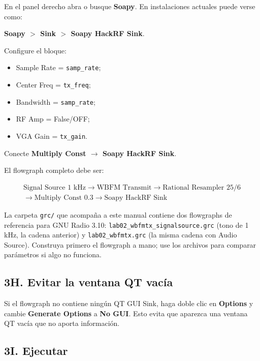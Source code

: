 En el panel derecho abra o busque \textbf{Soapy}. En instalaciones actuales puede verse como:

\begin{center}
\textbf{Soapy $>$ Sink $>$ Soapy HackRF Sink}.
\end{center}

Configure el bloque:

\begin{itemize}
    \item Sample Rate = \texttt{samp\_rate};
    \item Center Freq = \texttt{tx\_freq};
    \item Bandwidth = \texttt{samp\_rate};
    \item RF Amp = False/OFF;
    \item VGA Gain = \texttt{tx\_gain}.
\end{itemize}

Conecte \textbf{Multiply Const $\rightarrow$ Soapy HackRF Sink}.

El flowgraph completo debe ser:

\[
\boxed{
\begin{array}{c}
\text{Signal Source 1 kHz}
\rightarrow
\text{WBFM Transmit}
\rightarrow
\text{Rational Resampler }25/6\\[1mm]
\rightarrow
\text{Multiply Const }0.3
\rightarrow
\text{Soapy HackRF Sink}
\end{array}
}
\]

\begin{nota}
La carpeta \texttt{grc/} que acompaña a este manual contiene dos flowgraphs de referencia para GNU Radio 3.10: \texttt{lab02\_wbfmtx\_signalsource.grc} (tono de 1 kHz, la cadena anterior) y \texttt{lab02\_wbfmtx.grc} (la misma cadena con Audio Source). Construya primero el flowgraph a mano; use los archivos para comparar parámetros si algo no funciona.
\end{nota}

\subsection{3H. Evitar la ventana QT vacía}

Si el flowgraph no contiene ningún QT GUI Sink, haga doble clic en \textbf{Options} y cambie \textbf{Generate Options} a \textbf{No GUI}. Esto evita que aparezca una ventana QT vacía que no aporta información.

\subsection{3I. Ejecutar}

